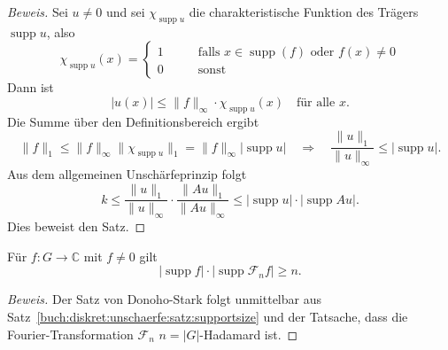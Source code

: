 \begin{proof}[Beweis]
Sei $u\ne 0$ und sei $\chi_{\operatorname{supp}u}$ die charakteristische
Funktion des Trägers $\operatorname{supp}u$, also
\[
\chi_{\operatorname{supp}u}(x)
=
\begin{cases}
1&\qquad\text{falls $x\in\operatorname{supp}(f)$ oder $f(x)\ne 0$}\\
0&\qquad\text{sonst}
\end{cases}
\]
Dann ist
\[
|u(x)|
\le
\|f\|_\infty\cdot \chi_{\operatorname{supp}u}(x)
\quad
\text{für alle $x$.}
\]
Die Summe über den Definitionsbereich ergibt
\[
\|f\|_1
\le
\|f\|_\infty \|\chi_{\operatorname{supp}u}\|_1
=
\|f\|_\infty |\operatorname{supp}u|
\quad\Rightarrow\quad
\frac{\|u\|_1}{\|u\|_\infty} \le |\operatorname{supp}u|.
\]
Aus dem allgemeinen Unschärfeprinzip folgt
\[
k
\le
\frac{\|u\|_1}{\|u\|_\infty}
\cdot
\frac{\|Au\|_1}{\|Au\|_\infty}
\le
|\operatorname{supp}u|
\cdot
|\operatorname{supp}Au|.
\]
Dies beweist den Satz.
\end{proof}

\begin{satz}
\label{buch:diskret:unschaerfe:satz:donoho-stark}
Für $f\colon G\to\mathbb{C}$ mit $f\ne 0$ gilt
\[
|\operatorname{supp}f|
\cdot
|\operatorname{supp}\mathscr{F}_nf|
\ge n.
\]
\end{satz}

\begin{proof}[Beweis]
Der Satz von Donoho-Stark folgt unmittelbar aus
Satz~\ref{buch:diskret:unschaerfe:satz:supportsize} und der
Tatsache, dass die Fourier-Transformation $\mathscr{F}_n$
$n=|G|$-Hadamard ist.
\end{proof}

%
%
